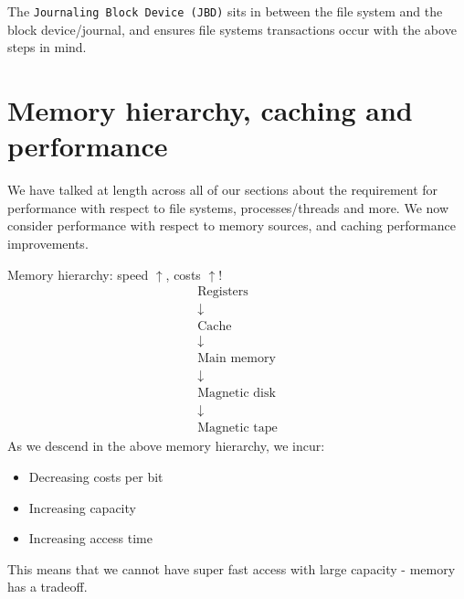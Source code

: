 \documentclass[journal, letterpaper]{IEEEtran}
\begin{document}
The \verb|Journaling Block Device (JBD)| sits in between the file system and the block device/journal, and ensures file systems transactions occur with the above steps in mind.

\section{Memory hierarchy, caching and performance}

We have talked at length across all of our sections about the requirement for performance with respect to file systems, processes/threads and more. We now consider performance with respect to memory sources, and caching performance improvements.
\begin{theory}{Memory hierarchy: speed $\uparrow$, costs $\uparrow$!}
    \begin{gather*}
        \text{Registers} \\ 
        \downarrow \\
        \text{Cache} \\
        \downarrow \\
        \text{Main memory} \\
        \downarrow \\
        \text{Magnetic disk} \\
        \downarrow \\
        \text{Magnetic tape}
    \end{gather*}
    As we descend in the above memory hierarchy, we incur:
    \begin{itemize}
        \item Decreasing costs per bit
        \item Increasing capacity
        \item Increasing access time
    \end{itemize}
    This means that we cannot have super fast access with large capacity - memory has a tradeoff.
\end{theory}
\end{document}
